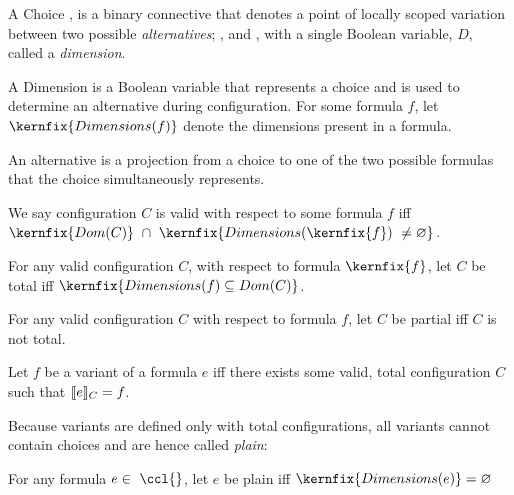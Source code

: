 \begin{definition}[Choice]
  A Choice , is a binary connective that denotes a point
  of locally scoped variation between two possible \textit{alternatives}; ,
  and , with a single Boolean variable, $D$, called a \textit{dimension}.
\end{definition}

\begin{definition}[Dimension]
  A Dimension is a Boolean variable that represents a choice and is used to
  determine an alternative during configuration. For some formula $f$, let
  $\kernfix{Dimensions(f)}$ denote the dimensions present in a \ccl{} formula.
\end{definition}

\begin{definition}[Alternative]
  An alternative is a projection from a choice to one of the two possible \ccl{}
  formulas that the choice simultaneously represents.
\end{definition}

\begin{definition}
  We say configuration $C$ is valid with respect to some formula $f$ iff
  $\kernfix{Dom(C)}\ \cap\ \kernfix{Dimensions(\kernfix{f})\ \neq \varnothing}$.
\end{definition}

\begin{definition}
    \label{tot:conf}
    For any valid configuration $C$, with respect to formula $\kernfix{f}$, let
    $C$ be total iff $\kernfix{Dimensions(f) \subseteq Dom(C)}$.
  \end{definition}
  \begin{corollary}
    For any valid configuration $C$ with respect to formula $f$, let $C$ be
    partial iff $C$ is not total.
  \end{corollary}
  \begin{definition}[Variant]
    Let $f$ be a variant of a formula $e$ iff there exists some
    valid, total configuration $C$ such that $\sem[C]{e} = f$.
  \end{definition}

  Because variants are defined only with total configurations, all variants cannot
  contain choices and are hence called \textit{plain}:

  \begin{definition}
    For any formula $e \in\ \ccl{}$, let $e$ be plain iff $\kernfix{Dimensions(e)}
    = \varnothing$
  \end{definition}



